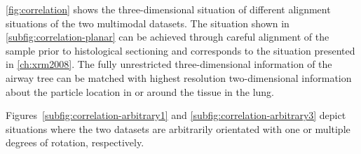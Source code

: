 \autoref{fig:correlation} shows the three-dimensional situation of different alignment situations of the two multimodal datasets. The situation shown in \autoref{subfig:correlation-planar} can be achieved through careful alignment of the sample prior to histological sectioning and corresponds to the situation presented in \autoref{ch:xrm2008}. The fully unrestricted three-dimensional information of the airway tree can be matched with highest resolution two-dimensional information about the particle location in or around the tissue in the lung.

Figures~\ref{subfig:correlation-arbitrary1} and \ref{subfig:correlation-arbitrary3} depict situations where the two datasets are arbitrarily orientated with one or multiple degrees of rotation, respectively.

\renewcommand{\imsize}{1.41\linewidth}%
